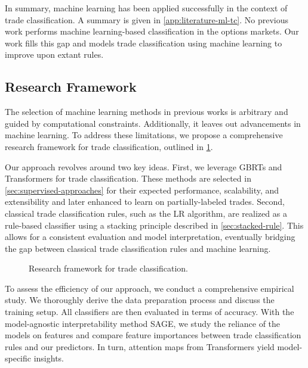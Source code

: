 In summary, machine learning has been applied successfully in the context of trade classification. A summary is given in \cref{app:literature-ml-tc}. No previous work performs machine learning-based classification in the options markets. Our work fills this gap and models trade classification using machine learning to improve upon extant rules.

\subsection{Research Framework}\label{sec:research-framework}

The selection of machine learning methods in previous works is arbitrary and guided by computational constraints. Additionally, it leaves out advancements in machine learning. To address these limitations, we propose a comprehensive research framework for trade classification, outlined in \cref{fig:research-framework}. 

Our approach revolves around two key ideas. First, we leverage \glspl{GBRT} and Transformers for trade classification. These methods are selected in \cref{sec:supervised-approaches} for their expected performance, scalability, and extensibility and later enhanced to learn on partially-labeled trades. Second, classical trade classification rules, such as the \gls{LR} algorithm, are realized as a rule-based classifier using a stacking principle described in \cref{sec:stacked-rule}. This allows for a consistent evaluation and model interpretation, eventually bridging the gap between classical trade classification rules and machine learning.

\begin{figure}[!ht]
    \centering
    {\renewcommand\normalsize{\tiny}
        \normalsize
        }
    \caption[Research Framework]{Research framework for trade classification.}
    \label{fig:research-framework}
\end{figure}

To assess the efficiency of our approach, we conduct a comprehensive empirical study. We thoroughly derive the data preparation process and discuss the training setup. All classifiers are then evaluated in terms of accuracy. With the model-agnostic interpretability method \gls{SAGE}, we study the reliance of the models on features and compare feature importances between trade classification rules and our predictors. In turn, attention maps from Transformers yield model-specific insights.
